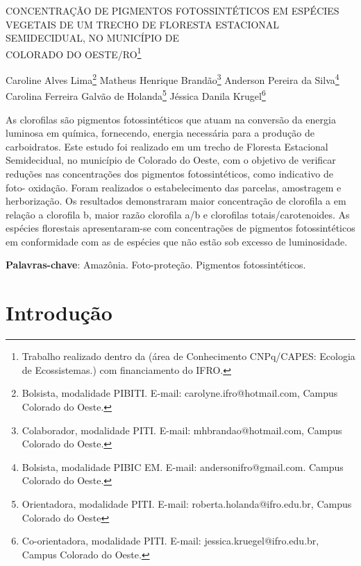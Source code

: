 \documentclass[article,12pt,onesidea,4paper,english,brazil]{abntex2}
\begin{document}
	
	
	\frenchspacing 
	
	\begin{center}
		\LARGE CONCENTRAÇÃO DE PIGMENTOS FOTOSSINTÉTICOS EM ESPÉCIES VEGETAIS DE UM TRECHO DE FLORESTA ESTACIONAL SEMIDECIDUAL, NO MUNICÍPIO DE \\COLORADO DO OESTE/RO\footnote{Trabalho realizado dentro da (área de Conhecimento CNPq/CAPES: Ecologia de Ecossistemas.) com financiamento do IFRO.}
		
		\normalsize
		Caroline Alves Lima\footnote{Bolsista, modalidade PIBITI. E-mail: carolyne.ifro@hotmail.com, Campus Colorado do Oeste.} 
		Matheus Henrique  Brandão\footnote{ Colaborador, modalidade PITI. E-mail: mhbrandao@hotmail.com, Campus Colorado do Oeste.} 
		Anderson Pereira da Silva\footnote{Bolsista, modalidade PIBIC EM. E-mail: andersonifro@gmail.com. Campus Colorado do Oeste.} \\
	Carolina Ferreira Galvão de Holanda\footnote{Orientadora, modalidade PITI. E-mail: roberta.holanda@ifro.edu.br, Campus Colorado do Oeste } 
	Jéssica Danila Krugel\footnote{Co-orientadora, modalidade PITI. E-mail: jessica.kruegel@ifro.edu.br, Campus Colorado do Oeste.}
	
	\end{center}
	
	\begin{resumoumacoluna}
	As clorofilas são pigmentos fotossintéticos que atuam na conversão da energia luminosa em química, fornecendo, energia necessária para a produção de carboidratos. Este estudo foi realizado em um trecho de Floresta Estacional Semidecidual, no município de Colorado do Oeste, com o objetivo de verificar reduções nas concentrações dos pigmentos fotossintéticos, como indicativo de foto- oxidação. Foram realizados o estabelecimento das parcelas, amostragem e herborização. Os resultados demonstraram maior concentração de clorofila a em relação a clorofila b, maior razão clorofila a/b e clorofilas totais/carotenoides. As espécies florestais apresentaram-se com concentrações de pigmentos fotossintéticos em conformidade com as de espécies que não estão sob excesso de luminosidade.
		\vspace{\onelineskip}
		
		\noindent
		\textbf{Palavras-chave}: Amazônia. Foto-proteção. Pigmentos fotossintéticos.
	\end{resumoumacoluna}
	
	\section*{Introdução}
	
\end{document}
